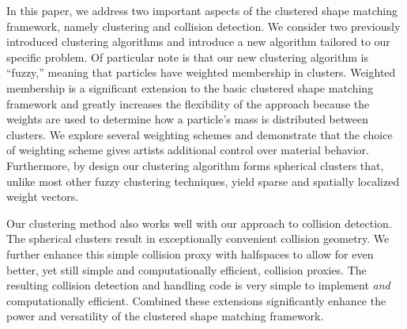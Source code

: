 \documentclass[review]{acmsiggraph}
\begin{document}
In this paper, we address two important aspects of the clustered shape matching framework, namely clustering
and collision detection.
We consider two previously introduced clustering algorithms and introduce a new algorithm tailored to our
specific problem.
Of particular note is that our new clustering algorithm is ``fuzzy,'' 
meaning that particles have weighted membership in clusters.
Weighted membership is a significant extension to the basic clustered shape matching framework and greatly
increases the flexibility of the approach because the weights are used to determine how a particle's
mass is distributed between clusters.
We explore several weighting schemes and demonstrate that the choice of weighting scheme gives 
artists additional control over material behavior.
Furthermore, by design our clustering algorithm forms spherical clusters that, unlike most other fuzzy clustering
techniques, yield sparse and spatially localized weight vectors.

Our clustering method also works well with our approach to collision detection.  The spherical clusters
result in exceptionally convenient collision geometry.  We further 
enhance this simple collision proxy with halfspaces to allow for even better, yet still simple and computationally efficient, 
collision proxies.  The resulting collision detection and handling code is very simple to implement {\em and} computationally efficient.
Combined these extensions significantly enhance the power and versatility of the clustered shape matching framework.


\end{document}
